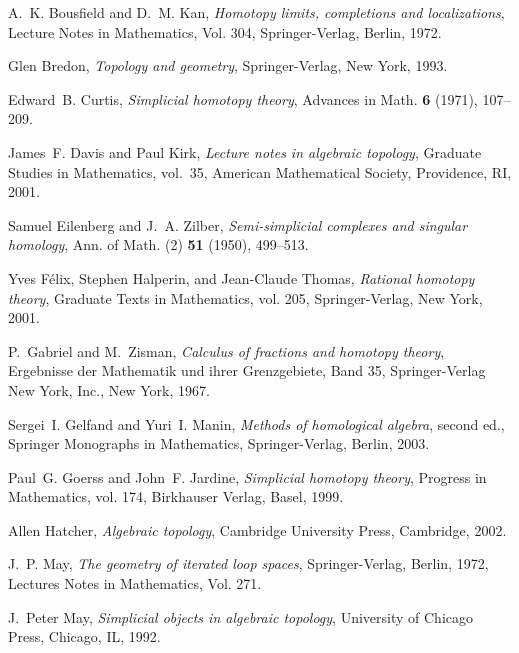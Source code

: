 \documentclass[12pt]{article}
\theoremstyle{plain}
\theoremstyle{definition}
\theoremstyle{remark}
\begin{document}
 
\providecommand{\bysame}{\leavevmode\hbox to3em{\hrulefill}\thinspace}
\providecommand{\MR}{\relax\ifhmode\unskip\space\fi MR }
\providecommand{\MRhref}[2]{%
  \href{http://www.ams.org/mathscinet-getitem?mr=#1}{#2}
}
\providecommand{\href}[2]{#2}
\begin{thebibliography}{10}

A.~K. Bousfield and D.~M. Kan, \emph{Homotopy limits, completions and
  localizations}, Lecture Notes in Mathematics, Vol. 304, Springer-Verlag,
  Berlin, 1972.

Glen Bredon, \emph{Topology and geometry}, Springer-Verlag, New York, 1993.

Edward~B. Curtis, \emph{Simplicial homotopy theory}, Advances in Math.
  \textbf{6} (1971), 107--209.

James~F. Davis and Paul Kirk, \emph{Lecture notes in algebraic topology},
  Graduate Studies in Mathematics, vol.~35, American Mathematical Society,
  Providence, RI, 2001.

Samuel Eilenberg and J.~A. Zilber, \emph{Semi-simplicial complexes and singular
  homology}, Ann. of Math. (2) \textbf{51} (1950), 499--513.

Yves F{\'e}lix, Stephen Halperin, and Jean-Claude Thomas, \emph{Rational
  homotopy theory}, Graduate Texts in Mathematics, vol. 205, Springer-Verlag,
  New York, 2001.

P.~Gabriel and M.~Zisman, \emph{Calculus of fractions and homotopy theory},
  Ergebnisse der Mathematik und ihrer Grenzgebiete, Band 35, Springer-Verlag
  New York, Inc., New York, 1967.

Sergei~I. Gelfand and Yuri~I. Manin, \emph{Methods of homological algebra},
  second ed., Springer Monographs in Mathematics, Springer-Verlag, Berlin,
  2003.

Paul~G. Goerss and John~F. Jardine, \emph{Simplicial homotopy theory}, Progress
  in Mathematics, vol. 174, Birkhauser Verlag, Basel, 1999.

Allen Hatcher, \emph{Algebraic topology}, Cambridge University Press,
  Cambridge, 2002.

J.~P. May, \emph{The geometry of iterated loop spaces}, Springer-Verlag,
  Berlin, 1972, Lectures Notes in Mathematics, Vol. 271.

J.~Peter May, \emph{Simplicial objects in algebraic topology}, University of
  Chicago Press, Chicago, IL, 1992.


\end{thebibliography}
\end{document}
